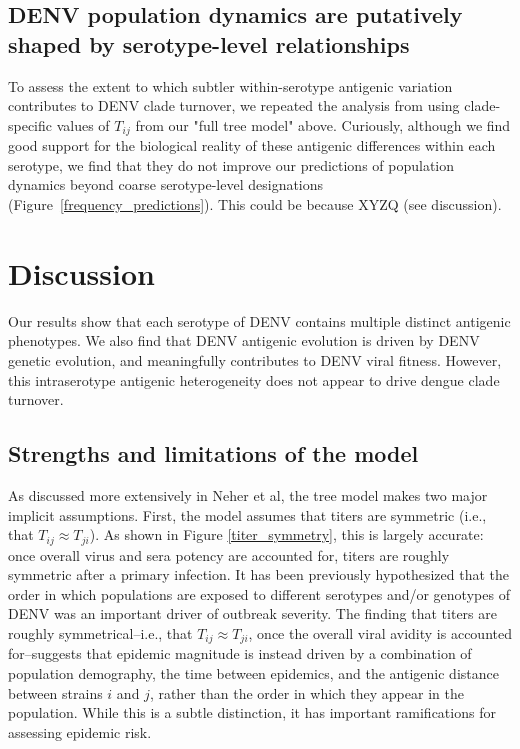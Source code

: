 \documentclass[11pt,oneside,letterpaper]{article}
\begin{document}
\subsection*{DENV population dynamics are putatively shaped by serotype-level relationships}
To assess the extent to which subtler within-serotype antigenic variation contributes to DENV clade turnover, we repeated the analysis from  using clade-specific values of $T_{ij}$ from our "full tree model" above.
Curiously, although we find good support for the biological reality of these antigenic differences within each serotype, we find that they do not improve our predictions of population dynamics beyond coarse serotype-level designations (Figure~\ref{frequency_predictions}).
This could be because XYZQ (see discussion).


\section*{Discussion}
Our results show that each serotype of DENV contains multiple distinct antigenic phenotypes. We also find that DENV antigenic evolution is driven by DENV genetic evolution, and meaningfully contributes to DENV viral fitness. However, this intraserotype antigenic heterogeneity does not appear to drive dengue clade turnover.

\subsection*{Strengths and limitations of the model}
As discussed more extensively in Neher et al, the tree model makes two major implicit assumptions.
First, the model assumes that titers are symmetric (i.e., that $T_{ij} \approx T_{ji}$).
As shown in Figure \ref{titer_symmetry}, this is largely accurate: once overall virus and sera potency are accounted for, titers are roughly symmetric after a primary infection.
It has been previously hypothesized that the order in which populations are exposed to different serotypes and/or genotypes of DENV was an important driver of outbreak severity.
The finding that titers are roughly symmetrical--i.e., that $T_{ij} \approx T_{ji}$, once the overall viral avidity is accounted for--suggests that epidemic magnitude is instead driven by a combination of population demography, the time between epidemics, and the antigenic distance between strains $i$ and $j$, rather than the order in which they appear in the population.
While this is a subtle distinction, it has important ramifications for assessing epidemic risk.
\end{document}
